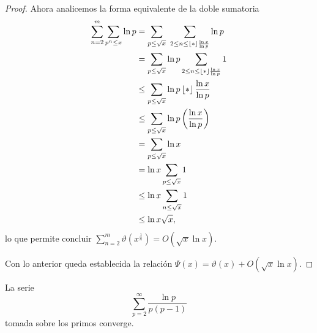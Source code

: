 \begin{proof}
Ahora analicemos la forma equivalente de la doble sumatoria
\begin{align}
\sum_{n = 2}^m \sum_{p^n \leq x} \ln p &= \sum_{p \leq \sqrt{x}} \, \, \sum_{2 \leq n \leq \left\lfloor * \right\rfloor{\frac{\ln x}{\ln p}}} \ln p \\
&= \sum_{p \leq \sqrt{x}} \ln p \sum_{2 \leq n \leq \left\lfloor * \right\rfloor{\frac{\ln x}{\ln p}}} 1 \\
&\leq \sum_{p \leq \sqrt{x}} \ln p \left\lfloor * \right\rfloor{\frac{\ln x}{\ln p}} \\
&\leq \sum_{p \leq \sqrt{x}} \ln p \left(\frac{\ln x}{\ln p}\right) \\
&= \sum_{p \leq \sqrt{x}} \ln x \\
&= \ln x \sum_{p \leq \sqrt{x}} 1 \\
&\leq \ln x \sum_{n \leq \sqrt{x}} 1 \\
&\leq \ln x \sqrt{x}, 
\end{align}
lo que permite concluir $\sum_{n = 2}^m \vartheta(x^\frac{1}{n}) = O(\sqrt{x} \ln x)$. 

Con lo anterior queda establecida la relaci\'on $\Psi(x) = \vartheta(x) + O(\sqrt{x} \ln x)$.
\end{proof}

\begin{lemma}\label{lem19}
La serie
\[
\sum_{p = 2}^{\infty} \frac{\ln p}{p (p - 1)}
\]
tomada sobre los primos converge.
\end{lemma}

